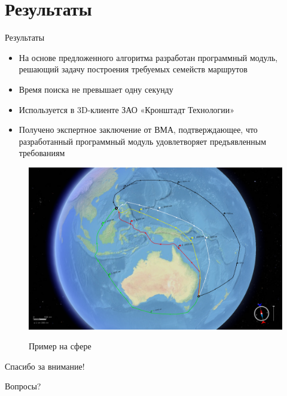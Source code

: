 \documentclass[russian, hyperref={unicode}]{beamer}
\begin{document}
\section{Результаты}

\begin{frame}{Результаты}
     {
        \begin{itemize}
            \item На основе предложенного алгоритма разработан программный
              модуль, решающий задачу построения требуемых семейств
              маршрутов
            \item Время поиска не превышает одну секунду
            \item Используется в 3D-клиенте ЗАО «Кронштадт Технологии»
            \item Получено экспертное заключение от ВМА,
              подтверждающее, что разработанный программный модуль
              удовлетворяет предъявленным требованиям
        \end{itemize}
    }
     {
        \begin{figure}
            \includegraphics[width=.9\textwidth]{Results/1}
            
            Пример на сфере
        \end{figure}
    }
\end{frame}

\begin{frame}{Спасибо за внимание!}
    \begin{center}
        \Huge
        {\color{blue} Вопросы?}
    \end{center}
\end{frame}

\appendix
\end{document}
